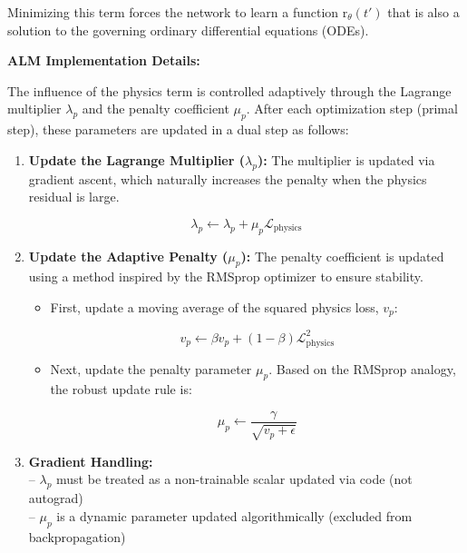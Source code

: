 \documentclass{article}
\begin{document}
Minimizing this term forces the network to learn a function $\mathrm{r}_\theta(t')$ that is also a solution to the governing ordinary differential equations (ODEs).

\textbf{ALM Implementation Details:}

The influence of the physics term is controlled adaptively through the Lagrange multiplier $\lambda_p$ and the penalty coefficient $\mu_p$. After each optimization step (primal step), these parameters are updated in a dual step as follows:

\begin{enumerate}
    \item \textbf{Update the Lagrange Multiplier ($\lambda_p$):} The multiplier is updated via gradient ascent, which naturally increases the penalty when the physics residual is large.
    
    \[
    \lambda_p \leftarrow \lambda_p + \mu_p \mathcal{L}_{\text{physics}}
    \]


    \item \textbf{Update the Adaptive Penalty ($\mu_p$):} The penalty coefficient is updated using a method inspired by the RMSprop optimizer to ensure stability.
    \begin{itemize}
        \item First, update a moving average of the squared physics loss, $v_p$:
        
        \[
        v_p \leftarrow \beta v_p + (1 - \beta) \mathcal{L}_{\text{physics}}^2
        \]
        
        \item Next, update the penalty parameter $\mu_p$. Based on the RMSprop analogy, the robust update rule is:
        
        \[
        \mu_p \leftarrow \frac{\gamma}{\sqrt{v_p + \epsilon}}
        \]
    \end{itemize}

    \item \textbf{Gradient Handling:} \\
    – $\lambda_p$ must be treated as a non-trainable scalar updated via code (not autograd) \\
    – $\mu_p$ is a dynamic parameter updated algorithmically (excluded from backpropagation)
\end{enumerate}
\end{document}
